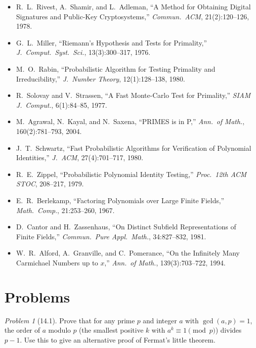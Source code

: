 \documentclass[twoside,12pt]{book}
\theoremstyle{plain}
\theoremstyle{definition}
\theoremstyle{remark}
\newtheorem{problem}[theorem]{Problem}
\begin{document}
\begin{itemize}[nosep]
    \item R.~L.~Rivest, A.~Shamir, and L.~Adleman, ``A Method for Obtaining Digital Signatures and Public-Key Cryptosystems,'' \textit{Commun.\ ACM}, 21(2):120--126, 1978.
    \item G.~L.~Miller, ``Riemann's Hypothesis and Tests for Primality,'' \textit{J.\ Comput.\ Syst.\ Sci.}, 13(3):300--317, 1976.
    \item M.~O.~Rabin, ``Probabilistic Algorithm for Testing Primality and Irreducibility,'' \textit{J.\ Number Theory}, 12(1):128--138, 1980.
    \item R.~Solovay and V.~Strassen, ``A Fast Monte-Carlo Test for Primality,'' \textit{SIAM J.\ Comput.}, 6(1):84--85, 1977.
    \item M.~Agrawal, N.~Kayal, and N.~Saxena, ``PRIMES is in P,'' \textit{Ann.\ of Math.}, 160(2):781--793, 2004.
    \item J.~T.~Schwartz, ``Fast Probabilistic Algorithms for Verification of Polynomial Identities,'' \textit{J.\ ACM}, 27(4):701--717, 1980.
    \item R.~E.~Zippel, ``Probabilistic Polynomial Identity Testing,'' \textit{Proc.\ 12th ACM STOC}, 208--217, 1979.
    \item E.~R.~Berlekamp, ``Factoring Polynomials over Large Finite Fields,'' \textit{Math.\ Comp.}, 21:253--260, 1967.
    \item D.~Cantor and H.~Zassenhaus, ``On Distinct Subfield Representations of Finite Fields,'' \textit{Commun.\ Pure Appl.\ Math.}, 34:827--832, 1981.
    \item W.~R.~Alford, A.~Granville, and C.~Pomerance, ``On the Infinitely Many Carmichael Numbers up to $x$,'' \textit{Ann.\ of Math.}, 139(3):703--722, 1994.
\end{itemize}

\section*{Problems}
\label{sec:problems-14}

\begin{problem}[14.1]
Prove that for any prime $p$ and integer $a$ with $\gcd(a, p) = 1$, the order of $a$ modulo $p$ (the smallest positive $k$ with $a^k \equiv 1 \pmod{p}$) divides $p - 1$. Use this to give an alternative proof of Fermat's little theorem.
\end{problem}
\end{document}

